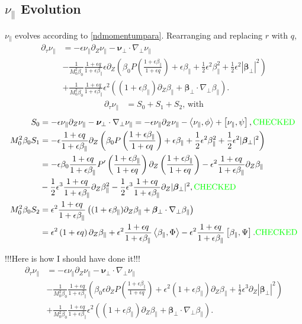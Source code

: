 \documentclass{article}
\newcommand{\para}{\parallel}
\newcommand{\ep}{\epsilon}
\newcommand{\np}{\nabla_\perp}
\newcommand{\p}{\partial}
\newcommand{\fr}{\frac{1+\ep q}{1+\ep\beta_\para}}
\newcommand{\frinv}{\frac{1+\ep\beta_\para}{1+\ep q}}
\newcommand{\pth} [1] {\left( #1 \right) }
\newcommand{\br} [1] {\left[ #1 \right] }
\begin{document}
\subsection{$\nu_\para$ Evolution}
$\nu_\para$ evolves according to \eqref{ndmomentumpara}. Rearranging and replacing $r$ with $q$, 
\begin{align*}
    \p_\tau\nu_\para &= -\ep\nu_\para\p_Z\nu_\para - \bm{\nu}_\perp\cdot \np\nu_\para \\ 
        &- \frac{1}{M_0^2\beta_0} \fr\ep\p_Z \pth{\beta_0P\pth{\frinv} + \ep\beta_\para + \frac{1}{2}\ep^2\beta_\para^2 + \frac{1}{2}\ep^2|\bm{\beta}_\perp|^2} \\ 
        &+ \frac{1}{M_0^2\beta_0} \fr\ep^2 \pth{(1+\ep\beta_\para)\p_Z\beta_\para + \bm{\beta}_\perp\cdot\np\beta_\para}. 
\end{align*}
\begin{align} \label{nuparaevolution} 
    \p_\tau\nu_\para &= S_0 + S_1 + S_2 \text{, with}
\end{align}
\begin{align*}
    S_0 &= -\ep\nu_\para\p_Z\nu_\para - \bm{\nu}_\perp\cdot\np\nu_\para = -\ep\nu_\para \p_Z\nu_\para - \Braket{\nu_\para, \phi} + \br{\nu_\para, \psi}, \text{\color{green}CHECKED}  \\ 
    M_0^2\beta_0 S_1 &= -\ep\fr\p_Z\pth{\beta_0P\pth{\frinv} + \ep\beta_\para + \frac{1}{2}\ep^2\beta_\para^2 + \frac{1}{2}\ep^2|\bm{\beta}_\perp|^2} \\ 
        &= -\ep\beta_0\fr P'\pth{\frinv}\p_Z \pth{\frinv} - \ep^2\fr\p_Z\beta_\para \\ 
        &- \frac{1}{2}\ep^3\fr\p_Z\beta_\para^2 - \frac{1}{2}\ep^3\fr\p_Z |\bm{\beta}_\perp|^2, \text{\color{green}CHECKED}  \\ 
    M_0^2\beta_0 S_2 &= \ep^2\fr \pth{(1+\ep\beta_\para)\p_Z\beta_\para + \bm{\beta}_\perp\cdot\np\beta_\para} \\ 
        &= \ep^2\pth{1+\ep q}\p_Z\beta_\para + \ep^2\fr\Braket{\beta_\para,\Phi} - \ep^2\fr\br{\beta_\para, \Psi}. \text{\color{green}CHECKED} 
\end{align*} 

!!!Here is how I should have done it!!!
\begin{align*}
    \p_\tau\nu_\para &= -\ep\nu_\para\p_Z\nu_\para - \bm{\nu}_\perp\cdot \np\nu_\para \\ 
        &- \frac{1}{M_0^2\beta_0} \fr \pth{\beta_0\ep \p_ZP\pth{\frinv} + \ep^2\pth{1+\ep\beta_\para}\p_Z\beta_\para + \frac{1}{2}\ep^3\p_Z|\bm{\beta}_\perp|^2} \\ 
        &+ \frac{1}{M_0^2\beta_0} \fr\ep^2 \pth{(1+\ep\beta_\para)\p_Z\beta_\para + \bm{\beta}_\perp\cdot\np\beta_\para}. 
\end{align*}
\end{document}
